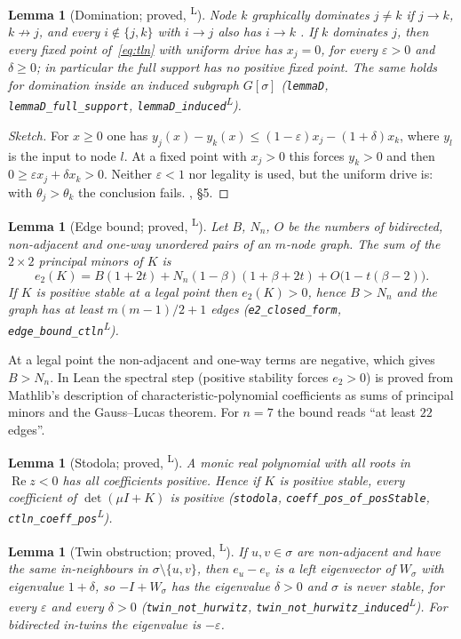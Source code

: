 \documentclass[11pt]{article}
\newtheorem{lemma}[theorem]{Lemma}
\theoremstyle{definition}
\newcommand{\eps}{\varepsilon}
\newcommand{\Rea}{\operatorname{Re}}
\newcommand{\lean}{\textsuperscript{\textsf{L}}}
\begin{document}
\begin{lemma}[Domination; proved, \lean]\label{lem:D}
Node $k$ \emph{graphically dominates} $j\ne k$ if $j\to k$, $k\not\to j$, and every $i\notin\{j,k\}$ with $i\to j$ also has
$i\to k$ \cite[Def.~1.1]{Curto2025}. If $k$ dominates $j$, then every fixed point of~\eqref{eq:tln} with uniform drive has
$x_j=0$, for every $\eps>0$ and $\delta\ge0$; in particular the full support has no positive fixed point. The same holds
for domination inside an induced subgraph $G[\sigma]$ (\texttt{lemmaD}, \texttt{lemmaD\_full\_support}, \texttt{lemmaD\_induced}\lean).
\end{lemma}
\begin{proof}[Sketch]
For $x\ge0$ one has $y_j(x)-y_k(x)\le(1-\eps)x_j-(1+\delta)x_k$, where $y_l$ is the input to node $l$. At a fixed
point with $x_j>0$ this forces $y_k>0$ and then $0\ge\eps x_j+\delta x_k>0$. Neither $\eps<1$ nor legality is used, but
the uniform drive is: with $\theta_j>\theta_k$ the conclusion fails. , \S5.
\end{proof}

\begin{lemma}[Edge bound; proved, \lean]\label{lem:e2}
Let $B$, $N_n$, $O$ be the numbers of bidirected, non-adjacent and one-way unordered pairs of an $m$-node graph. The
sum of the $2\times2$ principal minors of $K$ is
\[
e_2(K)=B(1+2t)+N_n(1-\beta)(1+\beta+2t)+O\bigl(1-t(\beta-2)\bigr).
\]
If $K$ is positive stable at a legal point then $e_2(K)>0$, hence $B>N_n$ and the graph has at least $m(m-1)/2+1$ edges
(\texttt{e2\_closed\_form}, \texttt{edge\_bound\_ctln}\lean).
\end{lemma}
At a legal point the non-adjacent and one-way terms are negative, which gives $B>N_n$. In Lean the spectral step
(positive stability forces $e_2>0$) is proved from Mathlib's description of characteristic-polynomial coefficients as
sums of principal minors and the Gauss--Lucas theorem. For $n=7$ the bound reads ``at least $22$ edges''.

\begin{lemma}[Stodola; proved, \lean]\label{lem:stodola}
A monic real polynomial with all roots in $\Rea z<0$ has all coefficients positive. Hence if $K$ is positive stable,
every coefficient of $\det(\mu I+K)$ is positive (\texttt{stodola}, \texttt{coeff\_pos\_of\_posStable}, \texttt{ctln\_coeff\_pos}\lean).
\end{lemma}

\begin{lemma}[Twin obstruction; proved, \lean]\label{lem:twin}
If $u,v\in\sigma$ are non-adjacent and have the same in-neighbours in $\sigma\setminus\{u,v\}$, then $e_u-e_v$ is a left
eigenvector of $W_\sigma$ with eigenvalue $1+\delta$, so $-I+W_\sigma$ has the eigenvalue $\delta>0$ and $\sigma$ is never
stable, for every $\eps$ and every $\delta>0$ (\texttt{twin\_not\_hurwitz}, \texttt{twin\_not\_hurwitz\_induced}\lean). For
bidirected in-twins the eigenvalue is $-\eps$.
\end{lemma}
\end{document}
